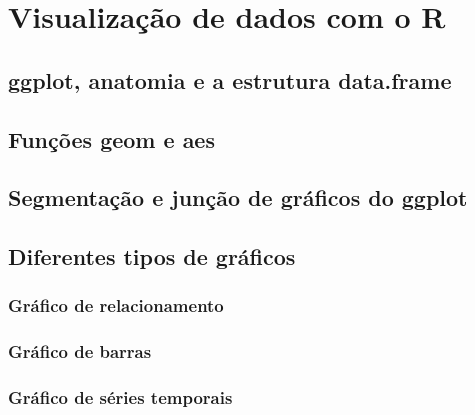 \documentclass[
]{book}
\begin{document}
\hypertarget{visu}{%
\chapter{Visualização de dados com o R}\label{visu}}

\hypertarget{ggplot-anatomia-e-a-estrutura-data.frame}{%
\section{ggplot, anatomia e a estrutura data.frame}\label{ggplot-anatomia-e-a-estrutura-data.frame}}

\hypertarget{funuxe7uxf5es-geom-e-aes}{%
\section{Funções geom e aes}\label{funuxe7uxf5es-geom-e-aes}}

\hypertarget{segmentauxe7uxe3o-e-junuxe7uxe3o-de-gruxe1ficos-do-ggplot}{%
\section{Segmentação e junção de gráficos do ggplot}\label{segmentauxe7uxe3o-e-junuxe7uxe3o-de-gruxe1ficos-do-ggplot}}

\hypertarget{diferentes-tipos-de-gruxe1ficos}{%
\section{Diferentes tipos de gráficos}\label{diferentes-tipos-de-gruxe1ficos}}

\hypertarget{gruxe1fico-de-relacionamento}{%
\subsection{Gráfico de relacionamento}\label{gruxe1fico-de-relacionamento}}

\hypertarget{gruxe1fico-de-barras}{%
\subsection{Gráfico de barras}\label{gruxe1fico-de-barras}}

\hypertarget{gruxe1fico-de-suxe9ries-temporais}{%
\subsection{Gráfico de séries temporais}\label{gruxe1fico-de-suxe9ries-temporais}}
\end{document}
